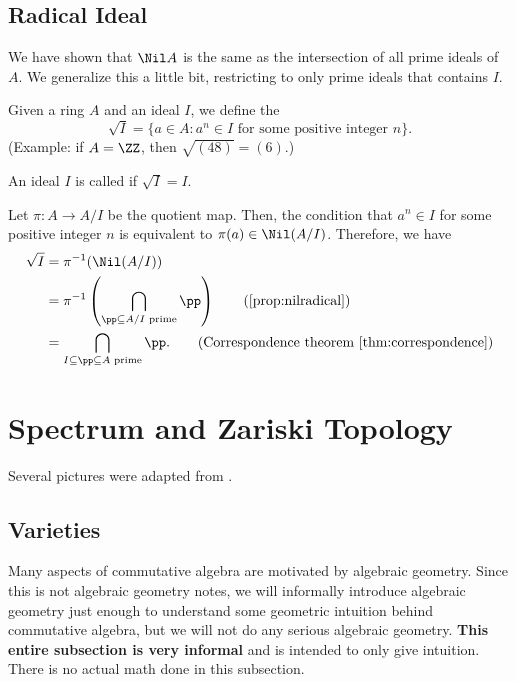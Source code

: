 \subsection{Radical Ideal}
We have shown that $\Nil A$ is the same as
the intersection of all prime ideals of $A$.
We generalize this a little bit, restricting to
only prime ideals that contains $I$.
\begin{definition}
    Given a ring $A$ and an ideal $I$,
    we define the 
    $$\sqrt I = \{a\in A : a^n\in I
    \text{ for some positive integer } n\}.$$
    (Example: if $A=\ZZ$, then $\sqrt{(48)} = (6)$.)
    
    An ideal $I$ is called 
    if $\sqrt I = I$.
\end{definition}
Let $\pi : A\to A/I$ be the quotient map.
Then, the condition that $a^n\in I$ 
for some positive integer $n$
is equivalent to $\pi(a)\in\Nil(A/I)$. 
Therefore, we have 
\begin{align*}\sqrt I 
&= \pi^{-1}(\Nil(A/I)) \\
&= \pi^{-1} \left(\bigcap_{\pp\subseteq A/I
\text{ prime}} \pp\right) \tag{\Cref{prop:nilradical}} \\
&= \bigcap_{I\subseteq \pp\subseteq A\text{ prime}}
\pp. \tag{Correspondence theorem \Cref{thm:correspondence}}
\end{align*}
\section{Spectrum and Zariski Topology}
\label{sec:spec}
Several pictures were adapted from \cite{napkin}.
\subsection{Varieties}
\label{subsec:varieties}
Many aspects of commutative algebra are motivated 
by algebraic geometry. 
Since this is not algebraic geometry notes,
we will informally introduce algebraic geometry
just enough to understand some geometric intuition
behind commutative algebra, but we will not do 
any serious algebraic geometry.
\textbf{This entire subsection is very informal}
and is intended to only give intuition.
There is no actual math done in this subsection.

